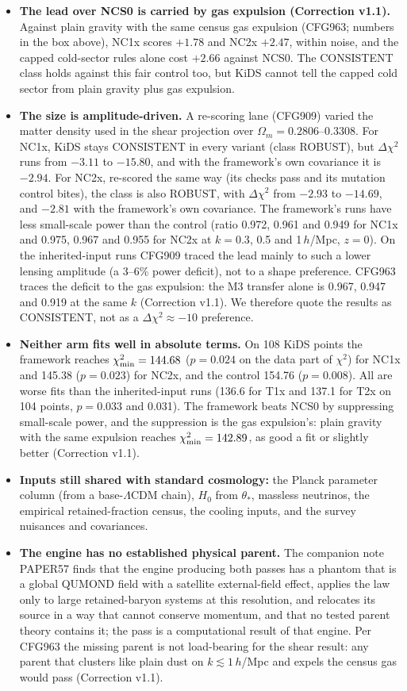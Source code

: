 \documentclass[10pt]{article}
\begin{document}
\begin{itemize}
\item \textbf{The lead over NCS0 is carried by gas expulsion (Correction v1.1).} Against plain gravity with the same census gas expulsion (CFG963; numbers in the box above), NC1x scores $+1.78$ and NC2x $+2.47$, within noise, and the capped cold-sector rules alone cost $+2.66$ against NCS0. The CONSISTENT class holds against this fair control too, but KiDS cannot tell the capped cold sector from plain gravity plus gas expulsion.
\item \textbf{The size is amplitude-driven.} A re-scoring lane (CFG909) varied the matter density used in the shear projection over $\Omega_m=0.2806$--$0.3308$. For NC1x, KiDS stays CONSISTENT in every variant (class ROBUST), but $\Delta\chi^2$ runs from $-3.11$ to $-15.80$, and with the framework's own covariance it is $-2.94$. For NC2x, re-scored the same way (its checks pass and its mutation control bites), the class is also ROBUST, with $\Delta\chi^2$ from $-2.93$ to $-14.69$, and $-2.81$ with the framework's own covariance.
The framework's runs have less small-scale power than the control (ratio 0.972, 0.961 and 0.949 for NC1x and 0.975, 0.967 and 0.955 for NC2x at $k=0.3$, 0.5 and 1\,$h$/Mpc, $z=0$). On the inherited-input runs CFG909 traced the lead mainly to such a lower lensing amplitude (a 3--6\% power deficit), not to a shape preference. CFG963 traces the deficit to the gas expulsion: the M3 transfer alone is 0.967, 0.947 and 0.919 at the same $k$ (Correction v1.1). We therefore quote the results as CONSISTENT, not as a $\Delta\chi^2\approx-10$ preference.
\item \textbf{Neither arm fits well in absolute terms.} On 108 KiDS points the framework reaches $\chi^2_{\rm min}=144.68$ ($p=0.024$ on the data part of $\chi^2$) for NC1x and 145.38 ($p=0.023$) for NC2x, and the control 154.76 ($p=0.008$). All are worse fits than the inherited-input runs (136.6 for T1x and 137.1 for T2x on 104 points, $p=0.033$ and 0.031). The framework beats NCS0 by suppressing small-scale power, and the suppression is the gas expulsion's: plain gravity with the same expulsion reaches $\chi^2_{\rm min}=142.89$, as good a fit or slightly better (Correction v1.1).
\item \textbf{Inputs still shared with standard cosmology:} the Planck parameter column (from a base-$\Lambda$CDM chain), $H_0$ from $\theta_*$, massless neutrinos, the empirical retained-fraction census, the cooling inputs, and the survey nuisances and covariances.
\item \textbf{The engine has no established physical parent.} The companion note PAPER57 finds that the engine producing both passes has a phantom that is a global QUMOND field with a satellite external-field effect, applies the law only to large retained-baryon systems at this resolution, and relocates its source in a way that cannot conserve momentum, and that no tested parent theory contains it; the pass is a computational result of that engine. Per CFG963 the missing parent is not load-bearing for the shear result: any parent that clusters like plain dust on $k\lesssim1\,h$/Mpc and expels the census gas would pass (Correction v1.1).
\end{itemize}
\end{document}
